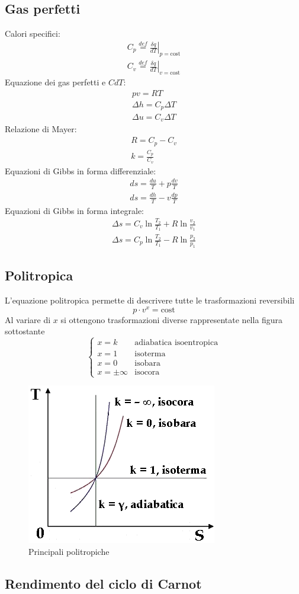 \documentclass[a4paper,10pt]{article}
\begin{document}
\subsection{Gas perfetti}
Calori specifici:
\begin{gather}
 C_p \stackrel{def}{=} \left.\frac{\delta q}{dT}\right|_{p=\text{cost}}\\
 C_v \stackrel{def}{=} \left.\frac{\delta q}{dT}\right|_{v=\text{cost}}
\end{gather}
Equazione dei gas perfetti e \(CdT\):
\begin{gather}
pv=RT\\
\Delta h=C_p\Delta T\\
\Delta u=C_v\Delta T
\end{gather}
Relazione di Mayer:
\begin{gather}
 R = C_p - C_v\\
 k = \frac{C_p}{C_v}
\end{gather}
Equazioni di Gibbs in forma differenziale:
\begin{gather}
 ds = \frac{du}{T} + p\frac{dv}{T}\\
 ds = \frac{dh}{T} - v\frac{dp}{T}
\end{gather}
Equazioni di Gibbs in forma integrale:
\begin{gather}
 \Delta s = C_v \ln{\frac{T_2}{T_1}} + R \ln{\frac{v_2}{v_1}} \\
 \Delta s = C_p \ln{\frac{T_2}{T_1}} - R \ln{\frac{p_2}{p_1}}
\end{gather}
\subsection{Politropica}
\label{subsec:politropica}
L'equazione politropica permette di descrivere tutte le trasformazioni reversibili
\begin{equation}
\label{eq:politropica}
 p\cdot v^x=\text{cost}
\end{equation}
Al variare di \(x\) si ottengono trasformazioni diverse rappresentate nella figura 
sottostante
\[\begin{cases}
 x=k & \text{adiabatica isoentropica}\\
 x=1 & \text{isoterma}\\
 x=0 & \text{isobara}\\
 x=\pm\infty & \text{isocora}
\end{cases}\]
\begin{figure}[H]
\label{fig:politropiche}
 \centering
 \includegraphics[width=0.5\linewidth]{media/politropiche.png}
 \caption{Principali politropiche}
\end{figure}

\subsection{Rendimento del ciclo di Carnot}
\label{subsec:rendimento_carnot}
\end{document}

